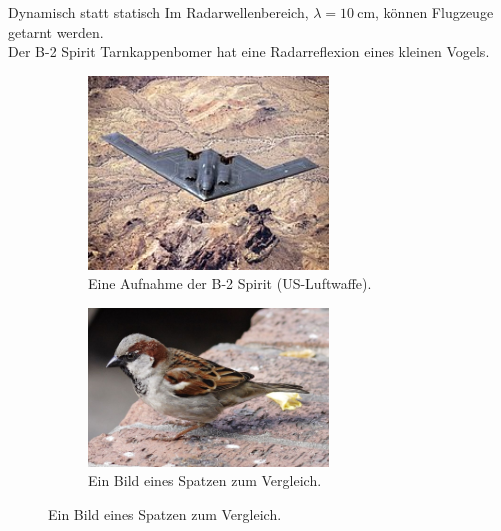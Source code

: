 \begin{frame}{Dynamisch statt statisch}
  Im Radarwellenbereich, $λ = \SI{10}{\centi\meter}$, können Flugzeuge getarnt werden. \\
  Der B-2 Spirit Tarnkappenbomer hat eine Radarreflexion eines kleinen Vogels.
  \begin{figure}
    \centering
    \begin{subfigure}{0.48\textwidth}
      \centering
      \caption{Eine Aufnahme der B-2 Spirit (US-Luftwaffe). \cite{b2spirit}}
      \includegraphics[width=0.7\textwidth]{images/b2spirit.jpg}
    \end{subfigure}
    \begin{subfigure}{0.48\textwidth}
      \centering
      \caption{Ein Bild eines Spatzen zum Vergleich. \cite{spatz}}
      \includegraphics[width=0.7\textwidth]{images/spatz.jpg}
    \end{subfigure}
  \end{figure}
\end{frame}


